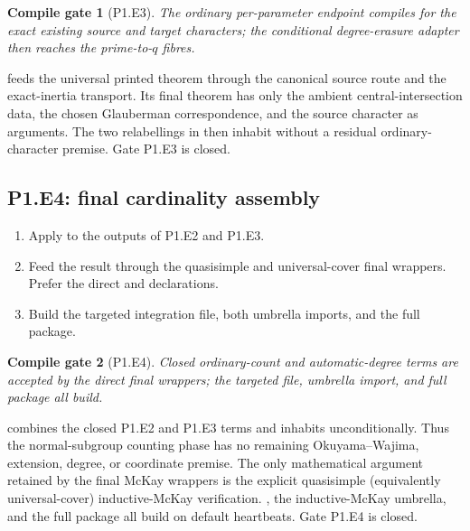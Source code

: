 \documentclass[11pt]{article}
\newtheorem{gate}{Compile gate}
\begin{document}
\begin{gate}[P1.E3]
The ordinary per-parameter endpoint compiles for the exact existing source
and target characters; the conditional degree-erasure adapter then reaches
the prime-to-\(q\) fibres.
\end{gate}

feeds the universal printed theorem through the canonical source route and
the exact-inertia transport.  Its final theorem has only the ambient
central-intersection data, the chosen Glauberman correspondence, and the
source character as arguments.  The two
 relabellings in
then inhabit
without a residual ordinary-character premise.  Gate P1.E3 is closed.

\subsection{P1.E4: final cardinality assembly}

\begin{enumerate}[label=\textbf{P1.E4.\arabic*.},leftmargin=*]
  \item Apply
  to the outputs of P1.E2 and P1.E3.
  \item Feed the result through the quasisimple and universal-cover final
  wrappers.  Prefer the direct
   and
  declarations.
  \item Build the targeted integration file, both umbrella imports, and
  the full package.
\end{enumerate}

\begin{gate}[P1.E4]
Closed ordinary-count and automatic-degree terms are accepted by the
direct final wrappers; the targeted file, umbrella import, and full package
all build.
\end{gate}

combines the closed P1.E2 and P1.E3 terms and inhabits
unconditionally.  Thus the normal-subgroup counting phase has no remaining
Okuyama--Wajima, extension, degree, or coordinate premise.  The only
mathematical argument retained by the final McKay wrappers is the explicit
quasisimple (equivalently universal-cover) inductive-McKay verification.
, the inductive-McKay umbrella, and
the full package all build on default heartbeats.  Gate P1.E4 is closed.
\end{document}
